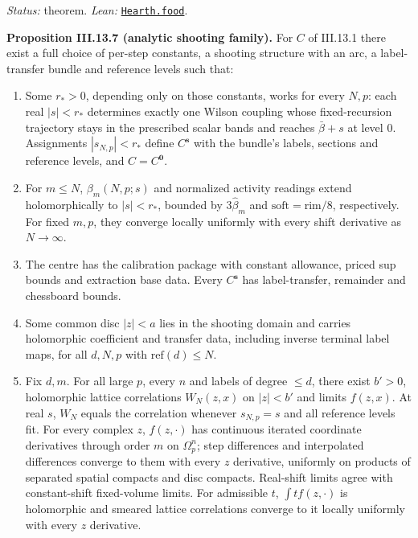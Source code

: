 \documentclass[
  letterpaper,
  11pt]{article}
\providecommand{\tightlist}{%
  \setlength{\itemsep}{0pt}\setlength{\parskip}{0pt}}
\begin{document}
\emph{Status:} theorem. \emph{Lean:}
\href{https://github.com/yang-mills-group/OpenAI-YM-20261028/blob/3456e5e75cf8d4cd558955a5c7638fba2d68f464/YM/UVExtension/Hearth/Table.lean\#L87-L112}{\texttt{Hearth.food}}.

\textbf{Proposition III.13.7 (analytic shooting family).} For \(C\) of
III.13.1 there exist a full choice of per-step constants, a shooting
structure with an arc, a label-transfer bundle and reference levels such
that:

\begin{enumerate}
\def\labelenumi{\arabic{enumi}.}
\tightlist
\item
  Some \(r_*>0\), depending only on those constants, works for every
  \(N,p\): each real \(|s|<r_*\) determines exactly one Wilson coupling
  whose fixed-recursion trajectory stays in the prescribed scalar bands
  and reaches \(\bar\beta+s\) at level \(0\). Assignments
  \(|s_{N,p}|<r_*\) define \(C^{\mathbf s}\) with the bundle's labels,
  sections and reference levels, and \(C=C^{\mathbf0}\).
\item
  For \(m\le N\), \(\beta_m(N,p;s)\) and normalized activity readings
  extend holomorphically to \(|s|<r_*\), bounded by \(3\hat\beta_m\) and
  \(\mathrm{soft}=\mathrm{rim}/8\), respectively. For fixed \(m,p\),
  they converge locally uniformly with every shift derivative as
  \(N\to\infty\).
\item
  The centre has the calibration package with constant allowance, priced
  sup bounds and extraction base data. Every \(C^{\mathbf s}\) has
  label-transfer, remainder and chessboard bounds.
\item
  Some common disc \(|z|<a\) lies in the shooting domain and carries
  holomorphic coefficient and transfer data, including inverse terminal
  label maps, for all \(d,N,p\) with \(\mathrm{ref}(d)\le N\).
\item
  Fix \(d,m\). For all large \(p\), every \(n\) and labels of degree
  \(\le d\), there exist \(b'>0\), holomorphic lattice correlations
  \(W_N(z,x)\) on \(|z|<b'\) and limits \(f(z,x)\). At real \(s\),
  \(W_N\) equals the correlation whenever \(s_{N,p}=s\) and all
  reference levels fit. For every complex \(z\), \(f(z,\cdot)\) has
  continuous iterated coordinate derivatives through order \(m\) on
  \(\Omega_p^n\); step differences and interpolated differences converge
  to them with every \(z\) derivative, uniformly on products of
  separated spatial compacts and disc compacts. Real-shift limits agree
  with constant-shift fixed-volume limits. For admissible \(t\),
  \(\int tf(z,\cdot)\) is holomorphic and smeared lattice correlations
  converge to it locally uniformly with every \(z\) derivative.
\end{enumerate}
\end{document}

